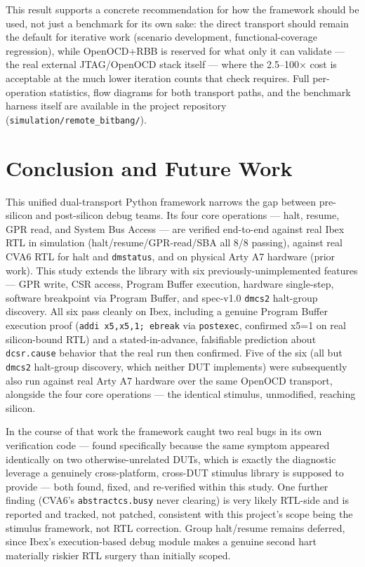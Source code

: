 \documentclass[conference]{IEEEtran}
\begin{document}
This result supports a concrete recommendation for how the framework should be used, not just a benchmark for its own sake: the direct transport should remain the default for iterative work (scenario development, functional-coverage regression), while OpenOCD+RBB is reserved for what only it can validate --- the real external JTAG/OpenOCD stack itself --- where the 2.5--100$\times$ cost is acceptable at the much lower iteration counts that check requires. Full per-operation statistics, flow diagrams for both transport paths, and the benchmark harness itself are available in the project repository (\texttt{simulation/remote\_bitbang/}).

\section{Conclusion and Future Work}

This unified dual-transport Python framework narrows the gap between pre-silicon and post-silicon debug teams. Its four core operations --- halt, resume, GPR read, and System Bus Access --- are verified end-to-end against real Ibex RTL in simulation (halt/resume/GPR-read/SBA all 8/8 passing), against real CVA6 RTL for halt and \texttt{dmstatus}, and on physical Arty A7 hardware (prior work). This study extends the library with six previously-unimplemented features --- GPR write, CSR access, Program Buffer execution, hardware single-step, software breakpoint via Program Buffer, and spec-v1.0 \texttt{dmcs2} halt-group discovery. All six pass cleanly on Ibex, including a genuine Program Buffer execution proof (\texttt{addi x5,x5,1; ebreak} via \texttt{postexec}, confirmed x5=1 on real silicon-bound RTL) and a stated-in-advance, falsifiable prediction about \texttt{dcsr.cause} behavior that the real run then confirmed. Five of the six (all but \texttt{dmcs2} halt-group discovery, which neither DUT implements) were subsequently also run against real Arty A7 hardware over the same OpenOCD transport, alongside the four core operations --- the identical stimulus, unmodified, reaching silicon.

In the course of that work the framework caught two real bugs in its own verification code --- found specifically because the same symptom appeared identically on two otherwise-unrelated DUTs, which is exactly the diagnostic leverage a genuinely cross-platform, cross-DUT stimulus library is supposed to provide --- both found, fixed, and re-verified within this study. One further finding (CVA6's \texttt{abstractcs.busy} never clearing) is very likely RTL-side and is reported and tracked, not patched, consistent with this project's scope being the stimulus framework, not RTL correction. Group halt/resume remains deferred, since Ibex's execution-based debug module makes a genuine second hart materially riskier RTL surgery than initially scoped.
\end{document}

